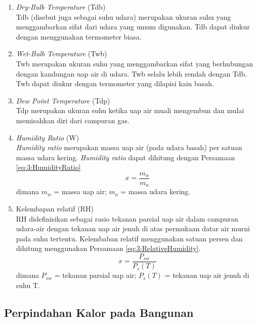 \begin{enumerate}
	\item \textit{Dry-Bulb Temperature} (Tdb) \\
	Tdb (disebut juga sebagai suhu udara) merupakan ukuran suhu yang menggambarkan sifat dari udara yang umum digunakan. Tdb dapat diukur dengan menggunakan termometer biasa.
	
	\item \textit{Wet-Bulb Temperature} (Twb) \\
	Twb merupakan ukuran suhu yang menggambarkan sifat yang berhubungan dengan kandungan uap air di udara. Twb selalu lebih rendah dengan Tdb. Twb dapat diukur dengan termometer yang dilapisi kain basah.
	
	\item \textit{Dew Point Temperature} (Tdp) \\
	Tdp merupakan ukuran suhu ketika uap air muali mengembun dan mulai memisahkan diri dari campuran gas.
	
	\item \textit{Humidity Ratio} (W)\\
	\textit{Humidity ratio} merupakan massa uap air (pada udara basah) per satuan massa udara kering. \textit{Humidity ratio} dapat dihitung dengan Persamaan \ref{eq:3:HumidityRatio}\\
	\begin{equation} \label{eq:3:HumidityRatio}
		x = \frac{m_w}{m_a} 
	\end{equation}
	dimana $m_w$ = massa uap air; $m_a$ = massa udara kering.
	
	\item Kelembapan relatif (RH) \\
	RH didefinisikan sebagai rasio tekanan parsial uap air dalam campuran udara-air dengan tekanan uap air jenuh di atas permukaan datar air murni pada suhu tertentu. Kelembaban relatif menggunakan satuan persen dan dihitung menggunakan Persamaan \ref{eq:3:RelativeHumidity}.
	\begin{equation} \label{eq:3:RelativeHumidity}
	x = \frac{P_{sw}}{P_s(T)} 
	\end{equation}
	dimana $P_{sw}$ = tekanan parsial uap air; $P_s(T)$ = tekanan uap air jenuh di suhu T.
\end{enumerate}

\subsection{Perpindahan Kalor pada Bangunan}

